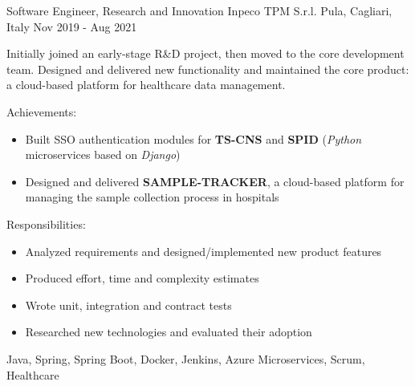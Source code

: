 \begin{cventries}
    \cventryextendedwithdoubletags
    	{Software Engineer, Research and Innovation} %
    	{Inpeco TPM S.r.l. } %
    	{Pula, Cagliari, Italy} %
    	{Nov 2019 - Aug 2021} %
    	{
    		\begin{cvitem}
				Initially joined an early-stage R\&D project, then moved to the core development team.
				Designed and delivered new functionality and maintained the core product: a cloud-based platform for healthcare data management.
    		\end{cvitem} 
    	}
    	{
    	\begin{cvitems}
    	  \item Achievements:
		  	\begin{itemize}
				\item Built SSO authentication modules for \textbf{TS-CNS} and \textbf{SPID} (\textit{Python} microservices based on \textit{Django})
				\item Designed and delivered \textbf{SAMPLE-TRACKER}, a cloud-based platform for managing the sample collection process in hospitals
			\end{itemize}
    	  \item Responsibilities:
    	    \begin{itemize}
				\item Analyzed requirements and designed/implemented new product features
				\item Produced effort, time and complexity estimates
				\item Wrote unit, integration and contract tests
				\item Researched new technologies and evaluated their adoption
  	        \end{itemize}
		\end{cvitems}
	  	}
        {Java, Spring, Spring Boot, Docker, Jenkins, Azure}
		{Microservices, Scrum, Healthcare}
        

\end{cventries}
